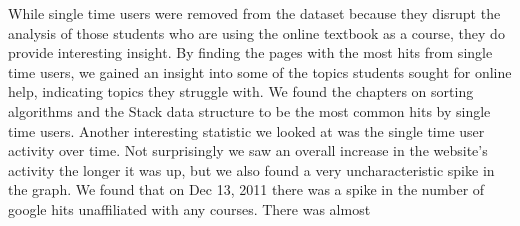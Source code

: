 While single time users were removed from the dataset because they disrupt the analysis of those students who are using the online textbook as a course, they do provide interesting insight. By finding the pages with the most hits from single time users, we gained an insight into some of the topics students sought  for online help, indicating topics they struggle with. We found the chapters on sorting algorithms and the Stack data structure to be the most common hits by single time users.  Another interesting statistic we looked at was the single time user activity over time. Not surprisingly we saw an overall increase in the website’s activity the longer it was up, but we also found a very uncharacteristic spike in the graph. We found that on Dec 13, 2011 there was a spike in the number of google hits unaffiliated with any courses.  There was almost %

